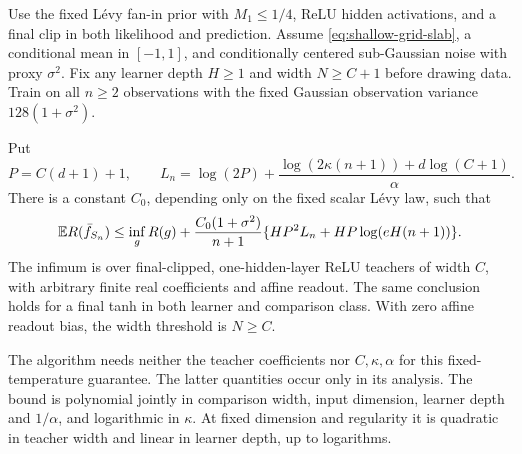 \begin{theorem}
\label{thm:shallow-continuous-quadratic}
Use the fixed L\'evy fan-in prior with $M_1\le1/4$, ReLU hidden activations, and a final clip in both likelihood and prediction. Assume \eqref{eq:shallow-grid-slab}, a conditional mean in $[-1,1]$, and conditionally centered sub-Gaussian noise with proxy $\sigma^2$. Fix any learner depth $H\ge1$ and width $N\ge C+1$ before drawing data. Train on all $n\ge2$ observations with the fixed Gaussian observation variance $128(1+\sigma^2)$.

Put
\[
 P=C(d+1)+1,\qquad
 L_n=\log(2P)+\frac{\log(2\kappa(n+1))+d\log(C+1)}\alpha.
\]
There is a constant $C_0$, depending only on the fixed scalar L\'evy law, such that
\begin{equation}
 \mathbb E R(\bar f_{S_n})
 \le\inf_g R(g)+\frac{C_0(1+\sigma^2)}{n+1}
       \{HP^2L_n+HP\log(eH(n+1))\}.
 \label{eq:continuous-shallow-quadratic}
\end{equation}
The infimum is over final-clipped, one-hidden-layer ReLU teachers of width $C$, with arbitrary finite real coefficients and affine readout. The same conclusion holds for a final tanh in both learner and comparison class. With zero affine readout bias, the width threshold is $N\ge C$.

The algorithm needs neither the teacher coefficients nor $C,\kappa,\alpha$ for this fixed-temperature guarantee. The latter quantities occur only in its analysis. The bound is polynomial jointly in comparison width, input dimension, learner depth and $1/\alpha$, and logarithmic in $\kappa$. At fixed dimension and regularity it is quadratic in teacher width and linear in learner depth, up to logarithms.
\end{theorem}
